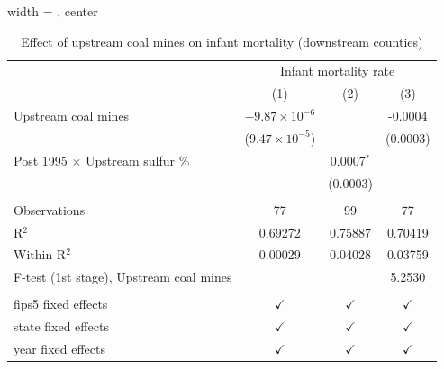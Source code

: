 
\begin{table}[htbp]
   
   \caption{\label{tab:county_imr_dwnstrm} Effect of upstream coal mines on infant mortality (downstream counties)}
   \bigskip
   
   \centering
   
   \begin{adjustbox}{width = \textwidth, center}
      
      
      \begin{tabular}{lccc}
         \toprule
         
          & \multicolumn{3}{c}{Infant mortality rate}\\
         
                                                 & (1)                     & (2)           & (3)\\  
         
         \midrule 
         Upstream coal mines                     & $-9.87\times 10^{-6}$   &               & -0.0004\\   
                                                 & ($9.47\times 10^{-5}$)  &               & (0.0003)\\   
         Post 1995 $\times$ Upstream sulfur \%   &                         & 0.0007$^{*}$  &   \\   
                                                 &                         & (0.0003)      &   \\   
         
          \\
         
         Observations                            & 77                      & 99            & 77\\  
         R$^2$                                   & 0.69272                 & 0.75887       & 0.70419\\  
         Within R$^2$                            & 0.00029                 & 0.04028       & 0.03759\\  
         F-test (1st stage), Upstream coal mines &                         &               & 5.2530\\  
         
          \\
         
         fips5 fixed effects                     & $\checkmark$            & $\checkmark$  & $\checkmark$\\   
         state fixed effects                     & $\checkmark$            & $\checkmark$  & $\checkmark$\\   
         year fixed effects                      & $\checkmark$            & $\checkmark$  & $\checkmark$\\   
         

\end{tabular}
\end{adjustbox}
\end{table}
